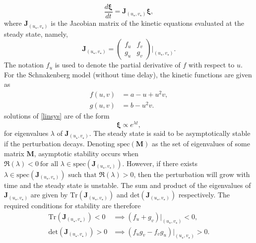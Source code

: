 \begin{equation}\label{linsys}
\frac{d\pmb{\xi}}{dt}=\textbf{J}_{(u_\star,v_\star)}\pmb{\xi},
\end{equation}
where $\textbf{J}_{(u_\star,v_\star)}$ is the Jacobian matrix of the kinetic equations evaluated at the steady state, namely,
$$
\textbf{J}_{(u_\star,v_\star)}=\begin{pmatrix}f_u&f_v\\g_u&g_v\end{pmatrix}\Bigg|_{(u_\star,v_\star)}.
$$
The notation $f_u$ is used to denote the partial derivative of $f$ with respect to $u$. For the Schnakenberg model (without time delay), the kinetic functions are given as
\begin{align*}
f(u,v)&=a-u+u^2v,\\
g(u,v)&=b-u^2v.
\end{align*}
 solutions of \eqref{linsys} are of the form
$$
\pmb{\xi}\propto e^{\lambda t},
$$
for eigenvalues $\lambda$ of $\textbf{J}_{(u_\star,v_\star)}$. The steady state is said to be asymptotically stable if the perturbation decays.
Denoting $\text{spec}(\textbf{M})$ as the set of eigenvalues of some matrix $\textbf{M}$, asymptotic stability occurs when $\Re(\lambda)<0 \ \text{for all }\lambda\in \text{spec}(\textbf{J}_{(u_\star,v_\star)})$. However, if there exists $\lambda\in \text{spec}(\textbf{J}_{(u_\star,v_\star)})\text{ such that } \Re(\lambda)>0$,
then the perturbation will grow with time and the steady state is unstable. The sum and product of the eigenvalues of $\textbf{J}_{(u_\star,v_\star)}$
are given by $\text{Tr}(\textbf{J}_{(u_\star,v_\star)})$ and $\text{det}(\textbf{J}_{(u_\star,v_\star)})$ respectively. The required conditions for stability are therefore
\begin{equation}\label{cond1}
    \begin{split}
\text{Tr}(\textbf{J}_{(u_\star,v_\star)})<0 &\implies (f_u+g_v)\big|_{(u_\star,v_\star)}<0, \\
\text{det}(\textbf{J}_{(u_\star,v_\star)})>0 &\implies (f_ug_v-f_vg_u)\big|_{(u_\star,v_\star)}>0.
\end{split}
\end{equation}

